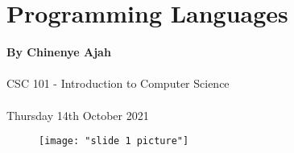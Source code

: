 \documentclass{article}
\begin{document}
	\section{Programming Languages}
	\textbf{By Chinenye Ajah}
	
	\paragraph{}
	CSC 101 -  Introduction to Computer Science
	
	\paragraph{}
	Thursday 14th October 2021

\begin{figure}
	\texttt{[image: "slide 1 picture"]}
	\caption{}
	\label{fig:slide-1-picture}
\end{figure}
\end{document}
